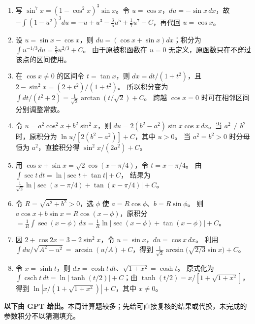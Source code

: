 \begin{enumerate}
$\sin(ax)\sin(bx)=\tfrac12[\cos((a-b)x)-\cos((a+b)x)]$。
定义 $C_c(x)=\sin(cx)/c$（$c\ne0$）、$C_0(x)=x$，
逐项积分得到 $\tfrac12[C_{a-b}(x)-C_{a+b}(x)]+C$。
\item 写 $\sin^7x=(1-\cos^2x)^3\sin x$。令 $u=\cos x$，$du=-\sin x\,dx$，故
$-\int(1-u^2)^3du=-u+u^3-\frac35u^5+\frac17u^7+C$，再代回 $u=\cos x$。
\item 设 $u=\sin x-\cos x$，则 $du=(\cos x+\sin x)dx$；积分为
$\int u^{-1/3}du=\frac32u^{2/3}+C$。
由于原被积函数在 $u=0$ 无定义，原函数只在不穿过该点的区间使用。
\item 在 $\cos x\ne0$ 的区间令 $t=\tan x$，则
$dx=dt/(1+t^2)$，且 $2-\sin^2x=(2+t^2)/(1+t^2)$。
所以积分变为 $\int dt/(t^2+2)=\frac1{\sqrt2}\arctan(t/\sqrt2)+C$。
跨越 $\cos x=0$ 时可在相邻区间分别调整常数。
\item 令 $u=a^2\cos^2x+b^2\sin^2x$，则
$du=2(b^2-a^2)\sin x\cos x\,dx$。当 $a^2\ne b^2$ 时，原积分为
$\ln u/[2(b^2-a^2)]+C$，其中 $u>0$。
当 $a^2=b^2>0$ 时分母恒为 $a^2$，直接积分得 $\sin^2x/(2a^2)+C$。
\item 用 $\cos x+\sin x=\sqrt2\cos(x-\pi/4)$，令 $t=x-\pi/4$。
由 $\int\sec t\,dt=\ln|\sec t+\tan t|+C$，
结果为 $\frac1{\sqrt2}\ln|\sec(x-\pi/4)+\tan(x-\pi/4)|+C$。
\item 令 $R=\sqrt{a^2+b^2}>0$，选 $\phi$ 使 $a=R\cos\phi$、$b=R\sin\phi$。
则 $a\cos x+b\sin x=R\cos(x-\phi)$，原积分
$=\frac1R\int\sec(x-\phi)\,dx
=\frac1R\ln|\sec(x-\phi)+\tan(x-\phi)|+C$。
\item 因 $2+\cos2x=3-2\sin^2x$，令 $u=\sin x$，$du=\cos x\,dx$。
利用 $\int du/\sqrt{A^2-u^2}=\arcsin(u/A)+C$，得到
$\frac1{\sqrt2}\arcsin\!\bigl(\sqrt{2/3}\sin x\bigr)+C$。
\item 令 $x=\sinh t$，则 $dx=\cosh t\,dt$、$\sqrt{1+x^2}=\cosh t$。
原式化为 $\int\operatorname{csch}t\,dt
=\ln|\tanh(t/2)|+C$；由 $\tanh(t/2)=x/[1+\sqrt{1+x^2}]$，
得到 $\ln|x/(1+\sqrt{1+x^2})|+C$，其中 $x\ne0$。
\end{enumerate}
\noindent\textbf{以下由 GPT 给出。}本周计算题较多；先给可直接复核的结果或代换，未完成的参数积分不以猜测填充。
